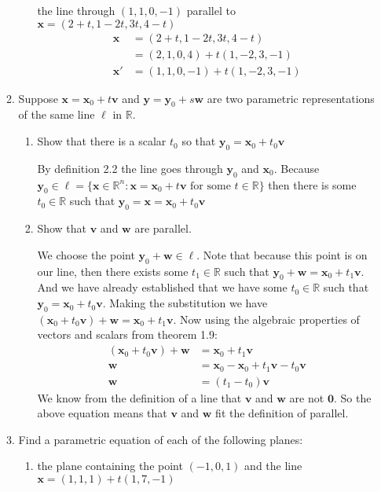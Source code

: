 \documentclass[letterpaper]{article}
\begin{document}
\begin{enumerate}
\begin{enumerate}
\begin{enumerate}
    the line through $(1, 1, 0, -1)$ parallel to $\mathbf{x}=(2+t,1-2t,3t,4-t)$
    \begin{align*}
      \mathbf{x}&=(2+t,1-2t,3t,4-t)\\
      &=(2,1,0,4)+t(1,-2,3,-1)\\
      \mathbf{x}'&=(1,1,0,-1)+t(1,-2,3,-1)
    \end{align*}
    \end{enumerate}
  \item
  Suppose $\mathbf{x}=\mathbf{x}_0+t\mathbf{v}$ and $\mathbf{y}=\mathbf{y}_0+s\mathbf{w}$ are two parametric representations of the same line $\ell$ in $\mathbb{R}$.
    \begin{enumerate}
    \item
    Show that there is a scalar $t_0$ so that $\mathbf{y}_0=\mathbf{x}_0+t_0\mathbf{v}$

    By definition 2.2 the line goes through $\mathbf{y}_0$ and $\mathbf{x}_0$. Because $\mathbf{y}_0\in\ell=\{\mathbf{x}\in \mathbb{R}^n:\mathbf{x}=\mathbf{x}_0+t\mathbf{v}\text{ for some }t\in \mathbb{R}\}$ then there is some $t_0\in\mathbb{R}$ such that $\mathbf{y}_0=\mathbf{x}=\mathbf{x}_0+t_0\mathbf{v}$
    \item
    Show that $\mathbf{v}$ and $\mathbf{w}$ are parallel.

    We choose the point $\mathbf{y}_0+\mathbf{w}\in \ell$.
    Note that because this point is on our line, then there exists some $t_1\in \mathbb{R}$ such that $\mathbf{y}_0+\mathbf{w}=\mathbf{x}_0+t_1\mathbf{v}$.
    And we have already established that we have some $t_0\in \mathbb{R}$ such that $\mathbf{y}_0=\mathbf{x}_0+t_0\mathbf{v}$. 
    Making the substitution we have $(\mathbf{x}_0+t_0\mathbf{v})+\mathbf{w}=\mathbf{x}_0+t_1\mathbf{v}$. Now using the algebraic properties of vectors and scalars from theorem 1.9:
    \begin{align*}
      (\mathbf{x}_0+t_0\mathbf{v})+\mathbf{w}&=\mathbf{x}_0+t_1\mathbf{v}\\
      \mathbf{w}&=\mathbf{x}_0-\mathbf{x}_0+t_1\mathbf{v}-t_0\mathbf{v}\\
      \mathbf{w}&=(t_1-t_0)\mathbf{v}
    \end{align*}
    We know from the definition of a line that $\mathbf{v}$ and $\mathbf{w}$ are not $\mathbf{0}$. So the above equation means that $\mathbf{v}$ and $\mathbf{w}$ fit the definition of parallel.
    \end{enumerate}
  \setcounter{enumii}{9}
  \item
  Find a parametric equation of each of the following planes:
    \begin{enumerate}
    \item
    the plane containing the point $(-1,0,1)$ and the line $\mathbf{x}=(1,1,1)+t(1,7,-1)$


\end{enumerate}
\end{enumerate}
\end{enumerate}
\end{document}
